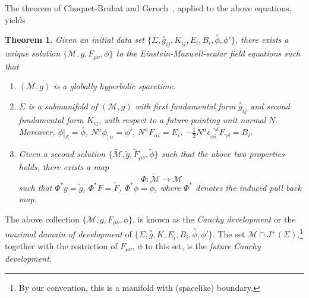 \documentclass{article}
\newtheorem{theorem}{Theorem}[section]
\begin{document}
The theorem of Choquet-Bruhat and Geroch~\cite{chge:givp}, applied to the above
equations, yields
\begin{theorem}
\label{cbg}
Given an initial data set $\{\Sigma, \stackrel{\circ}{g}_{ij}, K_{ij}, 
E_i, B_i,
\stackrel{\circ}\phi, \phi'\}$, there exists a unique
solution $\{\mathcal{M},g,F_{\mu\nu},\phi\}$
to the Einstein-Maxwell-scalar field equations such that
\begin{enumerate}
\item
$(\mathcal{M},g)$ is a globally hyperbolic spacetime.
\item
$\Sigma$ is a submanifold of $(\mathcal{M}, g)$ with first fundamental form
$\stackrel{\circ}{g}_{ij}$ and second fundamental form $K_{ij}$, with respect
to a future-pointing unit normal $N$. Moreover, $\phi|_\mathcal{S}=\stackrel
\circ{\phi}$, $N^\alpha\phi_{;\alpha}=\phi'$, $N^\alpha F_{\alpha i}=E_i$, 
$-\frac12N^{\alpha}\epsilon_{\alpha i}^{\ \ \gamma\delta}F_{\gamma\delta}=B_i$.
\item 
Given a second solution $\{\tilde{\mathcal{M}}, \tilde{g}, \tilde{F}_{\mu\nu},
\tilde{\phi}\}$ such that the above two properties holds,
there exists a map
\[
\Phi:\tilde{\mathcal{M}}\to\mathcal{M}
\]
such that $\Phi^*g=\tilde{g}$, $\Phi^*F=\tilde{F}$, $\Phi^*\phi=\tilde{\phi}$,
where $\Phi^*$ denotes the induced pull back map.
\end{enumerate}
\end{theorem}
The above collection $\{\mathcal{M},g, F_{\mu\nu}, \phi\}$, is known as the
\emph{Cauchy development} or the \emph{maximal domain of development}
of $\{\Sigma,\stackrel{\circ}{g},K,E_i,B_i,
\stackrel{\circ}{\phi},\phi'\}$. The set
$\mathcal{M}\cap J^+(\Sigma)$,\footnote{By
our convention, this is a manifold
with (spacelike) boundary.} together with the
restriction of $F_{\mu\nu}$, $\phi$ to this set,  is
the \emph{future Cauchy development}. 
\end{document}
